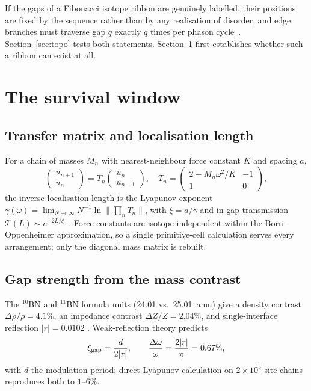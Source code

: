 \documentclass[aps,prl,preprint,superscriptaddress,longbibliography]{revtex4-2}
\begin{document}
If the gaps of a Fibonacci isotope ribbon are genuinely labelled, their
positions are fixed by the sequence rather than by any realisation of
disorder, and edge branches must traverse gap $q$ exactly $q$ times per
phason cycle~\cite{kraus2012,apigo2019}. Section~\ref{sec:topo} tests both
statements. Section~\ref{sec:survival} first establishes whether such a
ribbon can exist at all.

\section{The survival window}
\label{sec:survival}

\subsection{Transfer matrix and localisation length}

For a chain of masses $M_n$ with nearest-neighbour force constant $K$ and
spacing $a$,
\begin{equation}
\begin{pmatrix} u_{n+1} \\ u_n \end{pmatrix} = T_n
\begin{pmatrix} u_n \\ u_{n-1} \end{pmatrix}, \quad
T_n = \begin{pmatrix} 2 - M_n\omega^2/K & -1 \\ 1 & 0 \end{pmatrix},
\end{equation}
the inverse localisation length is the Lyapunov exponent
$\gamma(\omega) = \lim_{N\to\infty} N^{-1}\ln\|\prod_n T_n\|$, with
$\xi = a/\gamma$ and in-gap transmission
$\mathcal{T}(L) \sim e^{-2L/\xi}$~\cite{anderson1958}. Force constants are
isotope-independent within the Born--Oppenheimer approximation, so a single
primitive-cell calculation serves every arrangement; only the diagonal mass
matrix is rebuilt.

\subsection{Gap strength from the mass contrast}

The $^{10}$BN and $^{11}$BN formula units (24.01 vs.\ 25.01~amu) give a
density contrast $\Delta\rho/\rho = 4.1\%$, an impedance contrast
$\Delta Z/Z = 2.04\%$, and single-interface reflection $|r| = 0.0102$
\cite{vuong2018}. Weak-reflection theory predicts
\begin{equation}
\xi_{\rm gap} = \frac{d}{2|r|}, \qquad
\frac{\Delta\omega}{\omega} = \frac{2|r|}{\pi} = 0.67\%,
\label{eq:gapstrength}
\end{equation}
with $d$ the modulation period; direct Lyapunov calculation on
$2\times10^5$-site chains reproduces both to $1$--$6\%$.
\end{document}
